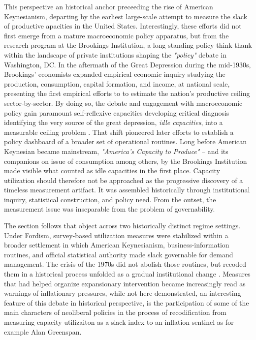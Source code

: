\documentclass[11pt,a4paper]{article}
\begin{document}
This perspective an historical anchor preceeding the rise of American Keynesianism, departing by the earliest large-scale attempt to measure the slack of productive apacities in the United States. Interestingly, these efforts did not first emerge from a mature macroeconomic policy apparatus, but from the research program at the Brookings Institution, a long-standing policy think-thank within the landscape of private institutions shaping the \textit{"policy"} debate in Washington, DC. In the aftermath of the Great Depression during the mid-1930s, Brookings' economists expanded empirical economic inquiry studying the production, consumption, capital formation, and income, at national scale, presenting the first empirical efforts to to estimate the nation’s productive ceiling sector-by-sector. By doing so, the debate and engagement with macroeconomic policy gain paramount self-reflexive capacities developing critical diagnosis identifying the very source of the great depression,  \emph{idle capacities}, into a measurable ceiling problem \citep{Nourse1934}. That shift pioneered later efforts to establish a policy  dashboard of a broader set of operational routines. Long before American Keynesian became mainstream, \textit{"America’s Capacity to Produce"} -- and its companions on issue of consumption among others, by the Brookings
Institution made visible what counted as idle capacities in the first place. Capacity utilization should therefore not be approached as the progressive discovery of a timeless measurement artifact. It was assembled historically through institutional inquiry, statistical construction, and policy need. From the outset, the measurement issue was inseparable from the problem of governability.

The section follows that object across two historically distinct regime settings. Under Fordism, survey-based utilization measures were stabilized within a broader settlement in which American Keynesianism, business-information routines, and official statistical authority made slack governable for demand management. The crisis of the 1970s did not abolish those routines, but recoded them in a historical process unfolded  
as a gradual institutional change \citep{MahoneyThelen2009}. Measures that had helped organize expansionary intervention became increasingly read as warnings of inflationary pressures, while not here demonstrated, an interesting feature of this debate in historical perspective, is the participation of some of the main characters of neoliberal policies in the process of recodification from measuring capacity utilizaiton as a slack index to an inflation sentinel as for example Alan Greenspan.  
\end{document}
